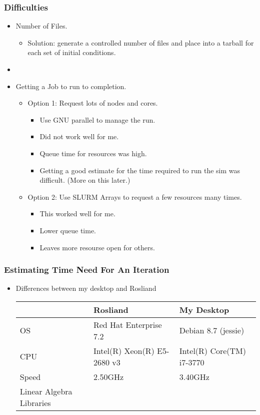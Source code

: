 \documentclass[10pt]{beamer}
\begin{document}
\begin{frame}[t]
  \frametitle{Difficulties}
  \begin{itemize}
    \item Number of Files.
      \begin{itemize} 
        \item Solution: generate a controlled number of files and place into a
          tarball for each set of initial conditions.
      \end{itemize}

    \item[]

    \item Getting a Job to run to completion.
      \begin{itemize}
        \item Option 1: Request lots of nodes and cores.
          \begin{itemize}
            \item Use GNU parallel to manage the run.
            \item Did not work well for me.
            \item Queue time for resources was high.
            \item Getting a good estimate for the time required to run the sim
              was difficult. (More on this later.)
          \end{itemize}
        \item Option 2: Use SLURM Arrays to request a few resources many times.
          \begin{itemize}
            \item This worked well for me.
            \item Lower queue time.
            \item Leaves more resourse open for others.
          \end{itemize}
      \end{itemize}
  \end{itemize}
\end{frame}

\begin{frame}[t]
  \frametitle{Estimating Time Need For An Iteration}
  \begin{itemize}
    \item Differences between my desktop and Rosliand
      \begin{tabular}{lll}
            & Rosliand                                  & My Desktop \\ \hline
        OS  & Red Hat Enterprise 7.2                    & Debian 8.7 (jessie) \\
        CPU & Intel(R) Xeon(R) E5-2680 v3 & Intel(R) Core(TM) i7-3770 \\
        Speed & 2.50GHz & 3.40GHz \\
        Linear Algebra Libraries & 
        \\ \hline
      \end{tabular}

  \end{itemize}
\end{frame}
\end{document}
